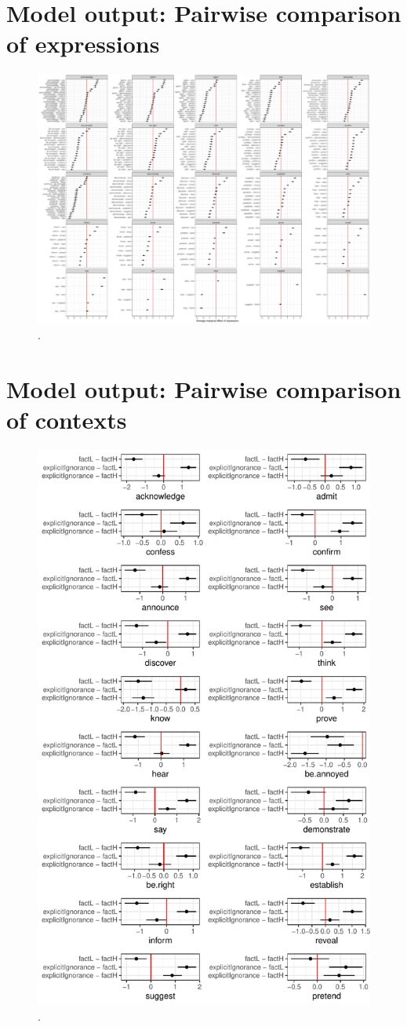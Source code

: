 \documentclass[11pt,fleqn]{article}
\newcommand{\6}{\mbox{$[\hspace*{-.6mm}[$}}
\newcommand{\9}{\mbox{$]\hspace*{-.6mm}]$}}
\begin{document}
\section{Model output: Pairwise comparison of expressions}\label{a:analysis1}

\begin{figure}
\centering
\includegraphics[width=\textwidth]{../../results/main/13explicitIgnorance/graphs/comparisons-in-EIC}
\caption{.}\label{fig:comparisons1}
\end{figure}

\section{Model output: Pairwise comparison of contexts}\label{a:analysis2}

\begin{figure}[h!]
\centering
\includegraphics[width=.8\textwidth]{../../results/main/13explicitIgnorance/graphs/context-comparisons}
\caption{.}\label{fig:comparisons2}
\end{figure}
 
\end{document}
